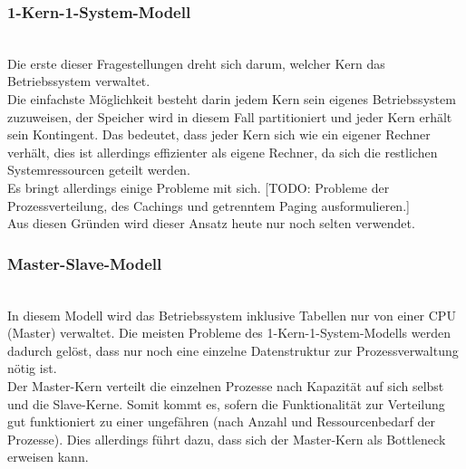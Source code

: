 \subsubsection{1-Kern-1-System-Modell} \quad \\
Die erste dieser Fragestellungen dreht sich darum, welcher Kern das Betriebssystem verwaltet. \\
Die einfachste Möglichkeit besteht darin jedem Kern sein eigenes Betriebssystem zuzuweisen, der Speicher wird in diesem Fall partitioniert und jeder Kern erhält sein Kontingent. Das bedeutet, dass jeder Kern sich wie ein eigener Rechner verhält, dies ist allerdings effizienter als eigene Rechner, da sich die restlichen Systemressourcen geteilt werden. \cite{tanenb2009} \\
Es bringt allerdings einige Probleme mit sich.
[TODO: Probleme der Prozessverteilung, des Cachings und getrenntem Paging ausformulieren.] \\
Aus diesen Gründen wird dieser Ansatz heute nur noch selten verwendet.

\subsubsection{Master-Slave-Modell} \quad \\
In diesem Modell wird das Betriebssystem inklusive Tabellen nur von einer CPU (Master) verwaltet. Die meisten Probleme des 1-Kern-1-System-Modells werden dadurch gelöst, dass nur noch eine einzelne Datenstruktur zur Prozessverwaltung nötig ist. \\
Der Master-Kern verteilt die einzelnen Prozesse nach Kapazität auf sich selbst und die Slave-Kerne. Somit kommt es, sofern die Funktionalität zur Verteilung gut funktioniert zu einer ungefähren (nach Anzahl und Ressourcenbedarf der Prozesse). Dies allerdings führt dazu, dass sich der Master-Kern als Bottleneck erweisen kann.
